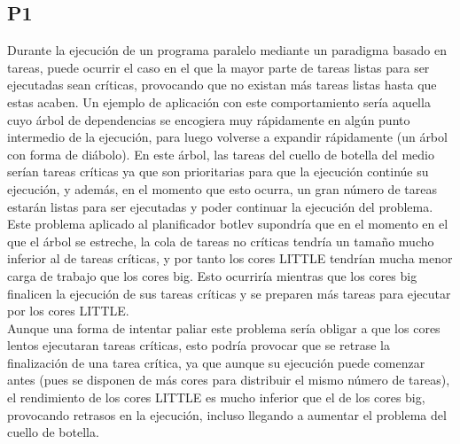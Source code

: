 \subsection{P1}
Durante la ejecución de un programa paralelo mediante un paradigma basado
en tareas, puede ocurrir el caso en el que la mayor parte de tareas listas
para ser ejecutadas sean críticas, provocando que no existan más tareas
listas hasta que estas acaben. Un ejemplo de aplicación con este
comportamiento sería aquella cuyo árbol de dependencias se encogiera muy
rápidamente en algún punto intermedio de la ejecución, para luego volverse
a expandir rápidamente (un árbol con forma de diábolo). En este árbol, las
tareas del cuello de botella del medio serían tareas críticas ya que son
prioritarias para que la ejecución continúe su ejecución, y además, en el
momento que esto ocurra, un gran número de tareas estarán listas para ser
ejecutadas y
poder continuar la ejecución del problema.\\
Este problema aplicado al planificador botlev supondría que en el momento
en el que el árbol se estreche, la cola de tareas no críticas tendría un
tamaño mucho inferior al de tareas críticas, y por tanto los cores LITTLE
tendrían mucha menor carga de trabajo que los cores big. Esto ocurriría
mientras que los cores big finalicen la ejecución de sus tareas críticas y
se preparen más tareas para ejecutar por los cores LITTLE.\\
Aunque una forma de intentar paliar este problema sería obligar a que los
cores lentos ejecutaran tareas críticas, esto podría provocar que se
retrase la finalización de una tarea crítica, ya que aunque su ejecución
puede comenzar antes (pues se disponen de más cores para distribuir el
mismo número de tareas), el rendimiento de los cores LITTLE es mucho
inferior que el de los cores big, provocando retrasos en la ejecución,
incluso llegando a aumentar el problema del cuello de botella.\\

